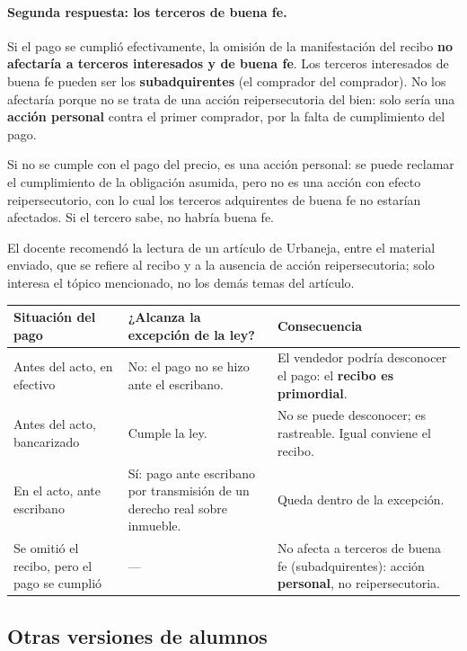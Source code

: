 \documentclass[12pt,oneside]{book}
\begin{document}
\paragraph{Segunda respuesta: los terceros de buena fe.}
Si el pago se cumplió efectivamente, la omisión de la manifestación del recibo \textbf{no afectaría a terceros interesados y de buena fe}. Los terceros interesados de buena fe pueden ser los \textbf{subadquirentes} (el comprador del comprador). No los afectaría porque no se trata de una acción reipersecutoria del bien: solo sería una \textbf{acción personal} contra el primer comprador, por la falta de cumplimiento del pago.

Si no se cumple con el pago del precio, es una acción personal: se puede reclamar el cumplimiento de la obligación asumida, pero no es una acción con efecto reipersecutorio, con lo cual los terceros adquirentes de buena fe no estarían afectados. Si el tercero sabe, no habría buena fe.

El docente recomendó la lectura de un artículo de Urbaneja, entre el material enviado, que se refiere al recibo y a la ausencia de acción reipersecutoria; solo interesa el tópico mencionado, no los demás temas del artículo.

\begin{table}[H]
\centering
\begin{tabularx}{\textwidth}{
    >{\raggedright\arraybackslash}p{}
    >{\raggedright\arraybackslash}X
    >{\raggedright\arraybackslash}X
}
\toprule
\textbf{Situación del pago} & \textbf{¿Alcanza la excepción de la ley?} & \textbf{Consecuencia} \\
\midrule
Antes del acto, en efectivo & No: el pago no se hizo ante el escribano. & El vendedor podría desconocer el pago: el \textbf{recibo es primordial}. \\
Antes del acto, bancarizado & Cumple la ley. & No se puede desconocer; es rastreable. Igual conviene el recibo. \\
En el acto, ante escribano & Sí: pago ante escribano por transmisión de un derecho real sobre inmueble. & Queda dentro de la excepción. \\
Se omitió el recibo, pero el pago se cumplió & --- & No afecta a terceros de buena fe (subadquirentes): acción \textbf{personal}, no reipersecutoria. \\
\bottomrule
\end{tabularx}
\end{table}

\subsection{Otras versiones de alumnos}
\end{document}
